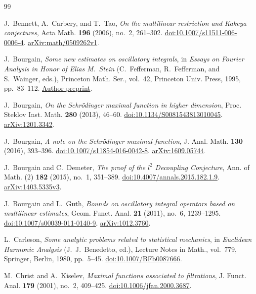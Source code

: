 \begin{thebibliography}{99}

J.~Bennett, A.~Carbery, and T.~Tao,
\emph{On the multilinear restriction and Kakeya conjectures},
Acta Math. \textbf{196} (2006), no.~2, 261--302.
\href{https://doi.org/10.1007/s11511-006-0006-4}{doi:10.1007/s11511-006-0006-4}.
\href{https://arxiv.org/abs/math/0509262v1}{arXiv:math/0509262v1}.

J.~Bourgain,
\emph{Some new estimates on oscillatory integrals},
in \emph{Essays on Fourier Analysis in Honor of Elias M.~Stein}
(C.~Fefferman, R.~Fefferman, and S.~Wainger, eds.),
Princeton Math. Ser., vol.~42,
Princeton Univ. Press, 1995, pp.~83--112.
\href{https://repo-archives.ihes.fr/FONDS_IHES/I_Prepublications/BOURGAIN/1990-1995/M_91_60/M_91_60_web.pdf}{Author preprint}.

J.~Bourgain,
\emph{On the Schr\"odinger maximal function in higher dimension},
Proc. Steklov Inst. Math. \textbf{280} (2013), 46--60.
\href{https://doi.org/10.1134/S0081543813010045}{doi:10.1134/S0081543813010045}.
\href{https://arxiv.org/abs/1201.3342}{arXiv:1201.3342}.

J.~Bourgain,
\emph{A note on the Schr\"odinger maximal function},
J. Anal. Math. \textbf{130} (2016), 393--396.
\href{https://doi.org/10.1007/s11854-016-0042-8}{doi:10.1007/s11854-016-0042-8}.
\href{https://arxiv.org/abs/1609.05744}{arXiv:1609.05744}.

J.~Bourgain and C.~Demeter,
\emph{The proof of the $l^2$ Decoupling Conjecture},
Ann. of Math. (2) \textbf{182} (2015), no.~1, 351--389.
\href{https://doi.org/10.4007/annals.2015.182.1.9}{doi:10.4007/annals.2015.182.1.9}.
\href{https://arxiv.org/abs/1403.5335v3}{arXiv:1403.5335v3}.

J.~Bourgain and L.~Guth,
\emph{Bounds on oscillatory integral operators based on multilinear estimates},
Geom. Funct. Anal. \textbf{21} (2011), no.~6, 1239--1295.
\href{https://doi.org/10.1007/s00039-011-0140-9}{doi:10.1007/s00039-011-0140-9}.
\href{https://arxiv.org/abs/1012.3760}{arXiv:1012.3760}.

L.~Carleson,
\emph{Some analytic problems related to statistical mechanics},
in \emph{Euclidean Harmonic Analysis}
(J.~J.~Benedetto, ed.),
Lecture Notes in Math., vol.~779,
Springer, Berlin, 1980, pp.~5--45.
\href{https://doi.org/10.1007/BFb0087666}{doi:10.1007/BFb0087666}.

M.~Christ and A.~Kiselev,
\emph{Maximal functions associated to filtrations},
J. Funct. Anal. \textbf{179} (2001), no.~2, 409--425.
\href{https://doi.org/10.1006/jfan.2000.3687}{doi:10.1006/jfan.2000.3687}.


\end{thebibliography}
